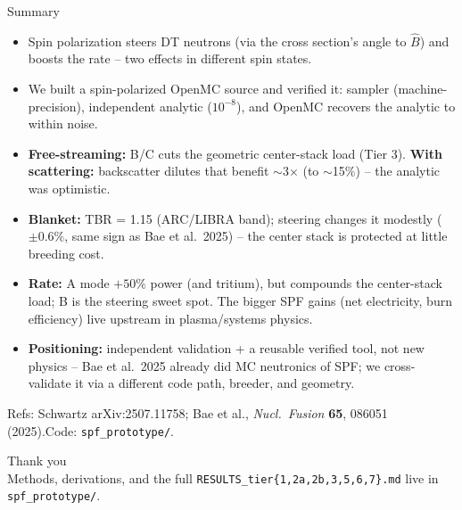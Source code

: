 \documentclass[aspectratio=169]{beamer}
\newcommand{\keyword}[1]{\textcolor{blue!60!black}{\textbf{#1}}}
\begin{document}
\begin{frame}{Summary}
  \begin{itemize}
    \item Spin polarization \alert{steers DT neutrons} (via the cross section's angle to $\hat B$) and \alert{boosts the rate} -- two effects in different spin states.
    \item We built a spin-polarized OpenMC source and \alert{verified it}: sampler (machine-precision), independent analytic ($10^{-8}$), and OpenMC \alert{recovers the analytic} to within noise.
    \item \keyword{Free-streaming:} B/C cuts the geometric center-stack load (Tier 3). \keyword{With scattering:} backscatter \alert{dilutes that benefit $\sim$3$\times$} (to $\sim$15\%) -- the analytic was optimistic.
    \item \keyword{Blanket:} \alert{TBR = 1.15} (ARC/LIBRA band); steering changes it \alert{modestly} ($\pm0.6\%$, same sign as Bae et al.\ 2025) -- the center stack is protected at little breeding cost.
    \item \keyword{Rate:} A mode $+50\%$ power (and tritium), but compounds the center-stack load; B is the steering sweet spot. The bigger SPF gains (net electricity, burn efficiency) live upstream in plasma/systems physics.
    \item \keyword{Positioning:} \alert{independent validation + a reusable verified tool}, not new physics -- Bae et al.\ 2025 already did MC neutronics of SPF; we cross-validate it via a different code path, breeder, and geometry.
  \end{itemize}
  \vfill
  \centering\scriptsize Refs: Schwartz arXiv:2507.11758; Bae et al., \emph{Nucl.\ Fusion} \textbf{65}, 086051 (2025).\quad Code: \texttt{spf\_prototype/}.
\end{frame}

\begin{frame}[plain]
  \centering\vfill
  {\Large Thank you}\\[6pt]
  \small Methods, derivations, and the full \texttt{RESULTS\_tier\{1,2a,2b,3,5,6,7\}.md} live in \texttt{spf\_prototype/}.
  \vfill
\end{frame}
\end{document}
